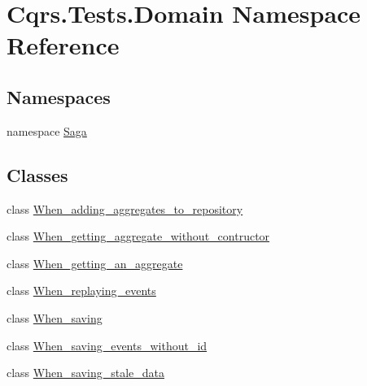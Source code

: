 \hypertarget{namespaceCqrs_1_1Tests_1_1Domain}{}\section{Cqrs.\+Tests.\+Domain Namespace Reference}
\label{namespaceCqrs_1_1Tests_1_1Domain}
\subsection*{Namespaces}
\begin{DoxyCompactItemize}
\item 
namespace \hyperlink{namespaceCqrs_1_1Tests_1_1Domain_1_1Saga}{Saga}
\end{DoxyCompactItemize}
\subsection*{Classes}
\begin{DoxyCompactItemize}
\item 
class \hyperlink{classCqrs_1_1Tests_1_1Domain_1_1When__adding__aggregates__to__repository}{When\+\_\+adding\+\_\+aggregates\+\_\+to\+\_\+repository}
\item 
class \hyperlink{classCqrs_1_1Tests_1_1Domain_1_1When__getting__aggregate__without__contructor}{When\+\_\+getting\+\_\+aggregate\+\_\+without\+\_\+contructor}
\item 
class \hyperlink{classCqrs_1_1Tests_1_1Domain_1_1When__getting__an__aggregate}{When\+\_\+getting\+\_\+an\+\_\+aggregate}
\item 
class \hyperlink{classCqrs_1_1Tests_1_1Domain_1_1When__replaying__events}{When\+\_\+replaying\+\_\+events}
\item 
class \hyperlink{classCqrs_1_1Tests_1_1Domain_1_1When__saving}{When\+\_\+saving}
\item 
class \hyperlink{classCqrs_1_1Tests_1_1Domain_1_1When__saving__events__without__id}{When\+\_\+saving\+\_\+events\+\_\+without\+\_\+id}
\item 
class \hyperlink{classCqrs_1_1Tests_1_1Domain_1_1When__saving__stale__data}{When\+\_\+saving\+\_\+stale\+\_\+data}
\end{DoxyCompactItemize}
